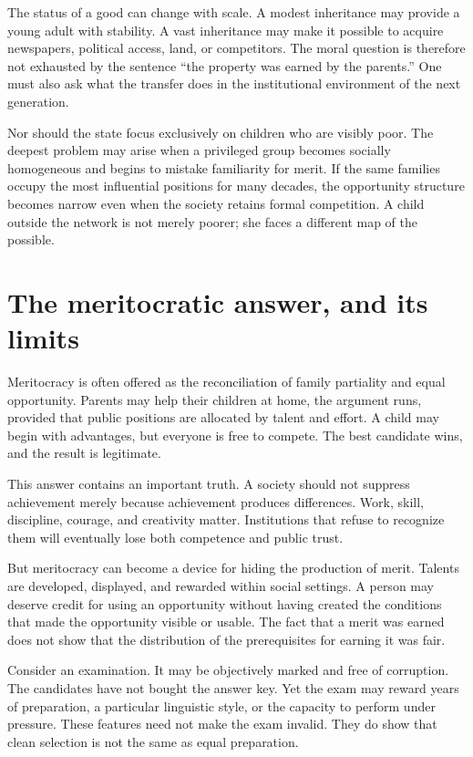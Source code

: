 ﻿\documentclass[12pt,a4paper]{book}
\begin{document}
The status of a good can change with scale.  A modest inheritance may provide
a young adult with stability.  A vast inheritance may make it possible to
acquire newspapers, political access, land, or competitors.  The moral
question is therefore not exhausted by the sentence ``the property was
earned by the parents.''  One must also ask what the transfer does in the
institutional environment of the next generation.

Nor should the state focus exclusively on children who are visibly poor.
The deepest problem may arise when a privileged group becomes socially
homogeneous and begins to mistake familiarity for merit.  If the same
families occupy the most influential positions for many decades, the
opportunity structure becomes narrow even when the society retains formal
competition.  A child outside the network is not merely poorer; she faces a
different map of the possible.

\section{The meritocratic answer, and its limits}

Meritocracy is often offered as the reconciliation of family partiality and
equal opportunity.  Parents may help their children at home, the argument
runs, provided that public positions are allocated by talent and effort.  A
child may begin with advantages, but everyone is free to compete.  The best
candidate wins, and the result is legitimate.

This answer contains an important truth.  A society should not suppress
achievement merely because achievement produces differences.  Work, skill,
discipline, courage, and creativity matter.  Institutions that refuse to
recognize them will eventually lose both competence and public trust.

But meritocracy can become a device for hiding the production of merit.
Talents are developed, displayed, and rewarded within social settings.  A
person may deserve credit for using an opportunity without having created
the conditions that made the opportunity visible or usable.  The fact that
a merit was earned does not show that the distribution of the prerequisites
for earning it was fair.

Consider an examination.  It may be objectively marked and free of
corruption.  The candidates have not bought the answer key.  Yet the exam
may reward years of preparation, a particular linguistic style, or the
capacity to perform under pressure.  These features need not make the exam
invalid.  They do show that clean selection is not the same as equal
preparation.
\end{document}

